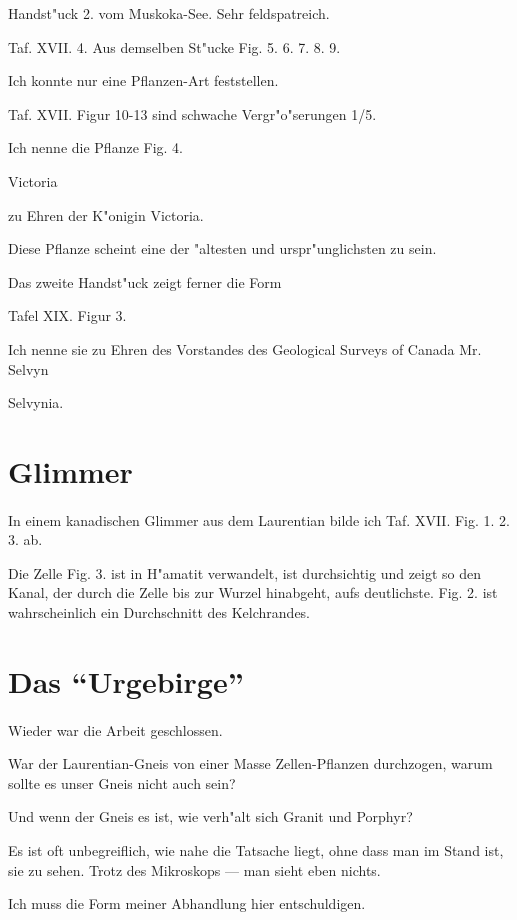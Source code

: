 \documentclass[a4paper, 11pt, oneside, german]{article}
\begin{document}
Handst"uck 2. vom Muskoka-See. Sehr feldspatreich.

Taf. XVII. 4. Aus demselben St"ucke Fig. 5. 6. 7. 8. 9.

Ich konnte nur eine Pflanzen-Art feststellen.

Taf. XVII. Figur 10-13 sind schwache Vergr"o"serungen 1/5.

Ich nenne die Pflanze Fig. 4.

Victoria

zu Ehren der K"onigin Victoria.

Diese Pflanze scheint eine der "altesten und urspr"unglichsten zu sein.

Das zweite Handst"uck zeigt ferner die Form

Tafel XIX. Figur 3.

Ich nenne sie zu Ehren des Vorstandes des Geological Surveys of Canada Mr. Selvyn

Selvynia.
\clearpage
\section{Glimmer}
\paragraph{}
In einem kanadischen Glimmer aus dem Laurentian bilde ich Taf. XVII. Fig. 1. 2. 3. ab.

Die Zelle Fig. 3. ist in H"amatit verwandelt, ist durchsichtig und zeigt so den Kanal, der durch die Zelle bis zur Wurzel hinabgeht, aufs deutlichste. Fig. 2. ist wahrscheinlich ein Durchschnitt des Kelchrandes.
\clearpage
\section{Das "`Urgebirge"'}
\paragraph{}
Wieder war die Arbeit geschlossen.

War der Laurentian-Gneis von einer Masse Zellen-Pflanzen durchzogen, warum sollte es unser Gneis nicht auch sein?

Und wenn der Gneis es ist, wie verh"alt sich Granit und Porphyr?

Es ist oft unbegreiflich, wie nahe die Tatsache liegt, ohne dass man im Stand ist, sie zu sehen. Trotz des Mikroskops --- man sieht eben nichts.

Ich muss die Form meiner Abhandlung hier entschuldigen.
\end{document}
